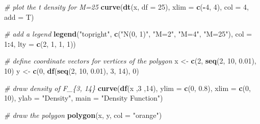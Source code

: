 \documentclass[
]{book}
\newenvironment{Shaded}{\begin{snugshade}}{\end{snugshade}}
\newcommand{\CommentTok}[1]{\textcolor[rgb]{0.56,0.35,0.01}{\textit{#1}}}
\newcommand{\DataTypeTok}[1]{\textcolor[rgb]{0.13,0.29,0.53}{#1}}
\newcommand{\DecValTok}[1]{\textcolor[rgb]{0.00,0.00,0.81}{#1}}
\newcommand{\FloatTok}[1]{\textcolor[rgb]{0.00,0.00,0.81}{#1}}
\newcommand{\KeywordTok}[1]{\textcolor[rgb]{0.13,0.29,0.53}{\textbf{#1}}}
\newcommand{\NormalTok}[1]{#1}
\newcommand{\OperatorTok}[1]{\textcolor[rgb]{0.81,0.36,0.00}{\textbf{#1}}}
\newcommand{\StringTok}[1]{\textcolor[rgb]{0.31,0.60,0.02}{#1}}
\begin{document}
\begin{Shaded}
\begin{Highlighting}[]
\CommentTok{# plot the t density for M=25}
\KeywordTok{curve}\NormalTok{(}\KeywordTok{dt}\NormalTok{(x, }\DataTypeTok{df =} \DecValTok{25}\NormalTok{), }
      \DataTypeTok{xlim =} \KeywordTok{c}\NormalTok{(}\OperatorTok{-}\DecValTok{4}\NormalTok{, }\DecValTok{4}\NormalTok{), }
      \DataTypeTok{col =} \DecValTok{4}\NormalTok{, }
      \DataTypeTok{add =}\NormalTok{ T)}

\CommentTok{# add a legend}
\KeywordTok{legend}\NormalTok{(}\StringTok{"topright"}\NormalTok{, }
       \KeywordTok{c}\NormalTok{(}\StringTok{"N(0, 1)"}\NormalTok{, }\StringTok{"M=2"}\NormalTok{, }\StringTok{"M=4"}\NormalTok{, }\StringTok{"M=25"}\NormalTok{), }
       \DataTypeTok{col =} \DecValTok{1}\OperatorTok{:}\DecValTok{4}\NormalTok{, }
       \DataTypeTok{lty =} \KeywordTok{c}\NormalTok{(}\DecValTok{2}\NormalTok{, }\DecValTok{1}\NormalTok{, }\DecValTok{1}\NormalTok{, }\DecValTok{1}\NormalTok{))}


\CommentTok{# define coordinate vectors for vertices of the polygon}
\NormalTok{x <-}\StringTok{ }\KeywordTok{c}\NormalTok{(}\DecValTok{2}\NormalTok{, }\KeywordTok{seq}\NormalTok{(}\DecValTok{2}\NormalTok{, }\DecValTok{10}\NormalTok{, }\FloatTok{0.01}\NormalTok{), }\DecValTok{10}\NormalTok{)}
\NormalTok{y <-}\StringTok{ }\KeywordTok{c}\NormalTok{(}\DecValTok{0}\NormalTok{, }\KeywordTok{df}\NormalTok{(}\KeywordTok{seq}\NormalTok{(}\DecValTok{2}\NormalTok{, }\DecValTok{10}\NormalTok{, }\FloatTok{0.01}\NormalTok{), }\DecValTok{3}\NormalTok{, }\DecValTok{14}\NormalTok{), }\DecValTok{0}\NormalTok{)}

\CommentTok{# draw density of F_\{3, 14\}}
\KeywordTok{curve}\NormalTok{(}\KeywordTok{df}\NormalTok{(x ,}\DecValTok{3}\NormalTok{ ,}\DecValTok{14}\NormalTok{), }
      \DataTypeTok{ylim =} \KeywordTok{c}\NormalTok{(}\DecValTok{0}\NormalTok{, }\FloatTok{0.8}\NormalTok{), }
      \DataTypeTok{xlim =} \KeywordTok{c}\NormalTok{(}\DecValTok{0}\NormalTok{, }\DecValTok{10}\NormalTok{), }
      \DataTypeTok{ylab =} \StringTok{"Density"}\NormalTok{,}
      \DataTypeTok{main =} \StringTok{"Density Function"}\NormalTok{)}

\CommentTok{# draw the polygon}
\KeywordTok{polygon}\NormalTok{(x, y, }\DataTypeTok{col =} \StringTok{"orange"}\NormalTok{)}
\end{Highlighting}
\end{Shaded}
\end{document}
